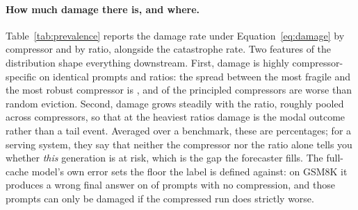 \paragraph{How much damage there is, and where.}
Table~\ref{tab:prevalence} reports the damage rate under
Equation~\ref{eq:damage} by compressor and by ratio, alongside the
catastrophe rate. Two features of the distribution shape everything
downstream. First, damage is highly compressor-specific on identical prompts
and ratios: the spread between the most fragile and the most robust
compressor is , and  of the
principled compressors are worse than random eviction. Second, damage grows
steadily with the ratio, roughly  pooled
across compressors, so that at the heaviest ratios damage is the modal
outcome rather than a tail event. Averaged over a benchmark, these are
percentages; for a serving system, they say that neither the compressor nor
the ratio alone tells you whether \emph{this} generation is at risk, which is
the gap the forecaster fills. The full-cache model's own error sets the floor
the label is defined against: on GSM8K it produces a wrong final answer on
 of prompts with no compression, and those prompts can only be
damaged if the compressed run does strictly worse.

